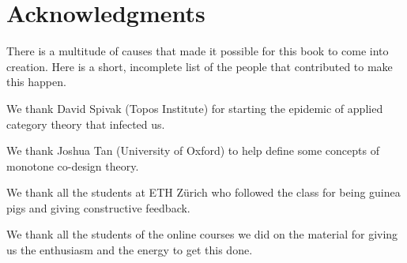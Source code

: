 
\section{Acknowledgments}

There is a multitude of causes that made it possible for this book to come into creation.
Here is a short, incomplete list of the people that contributed to make this happen.

We thank David Spivak (Topos Institute) for starting the epidemic of applied category theory that infected us.

We thank Joshua Tan (University of Oxford) to help define some concepts of monotone co-design theory.

We thank all the students at ETH Zürich who followed the class for being guinea pigs and giving constructive feedback.

We thank all the students of the online courses we did on the material for giving us the enthusiasm and the energy to get this done.

